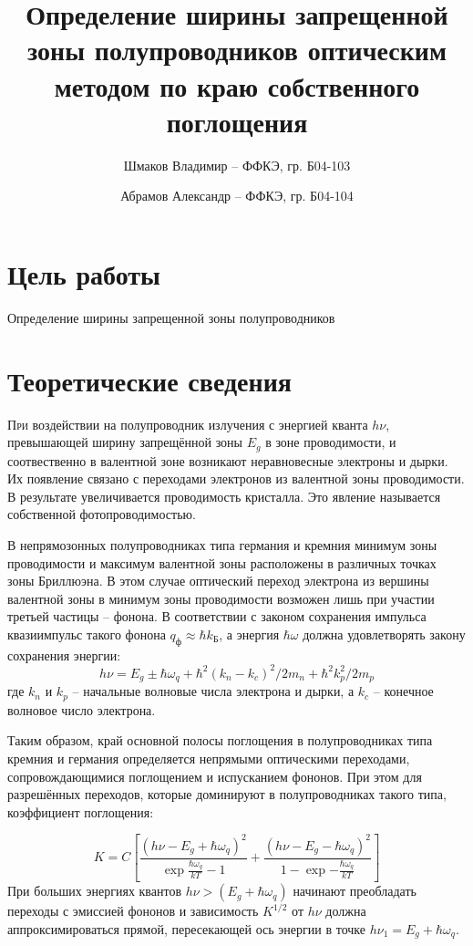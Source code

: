 \documentclass[a4paper, 12pt]{extarticle}
\title{\textcolor{main_title}{Определение ширины запрещенной зоны полупроводников оптическим методом по краю собственного поглощения}}
\author{
  Шмаков Владимир -- ФФКЭ, гр. Б04-103
  \and
  Абрамов Александр -- ФФКЭ, гр. Б04-104
}
\begin{document}
\maketitle



\section*{\textcolor{header}{Цель работы}}
    Определение ширины запрещенной зоны полупроводников
\section*{\textcolor{header}{Теоретические сведения}}

\lettrine{\textcolor{defenition}{П}}{\textcolor{defenition}{ри}} воздействии на полупроводник излучения с энергией кванта $h\nu$, превышающей ширину запрещённой зоны $E_g$ в зоне проводимости, и соотвественно в валентной зоне возникают неравновесные электроны и дырки. Их появление связано с переходами электронов из валентной зоны проводимости. В результате увеличивается проводимость кристалла. Это явление называется собственной фотопроводимостью.

В непрямозонных полупроводниках типа германия и кремния минимум зоны проводимости и максимум валентной зоны расположены в различных точках зоны Бриллюэна. В этом случае оптический переход электрона из вершины валентной зоны в минимум зоны проводимости возможен лишь при участии третьей частицы – фонона. В соответствии с законом сохранения импульса квазиимпульс такого фонона $q_{\text{ф}}\approx\hbar k_{\text{Б}}$, а энергия $\hbar\omega$ должна удовлетворять закону сохранения энергии:
\begin{equation}
    h\nu = E_g\pm \hbar\omega_q+\hbar^2(k_n-k_c)^2/2m_n+\hbar^2k_p^2/2m_p
\end{equation}
где $k_n$ и $k_p$ -- начальные волновые числа электрона и дырки, а $k_c$ -- конечное волновое число электрона.

Таким образом, край основной полосы поглощения в полупроводниках типа кремния и германия определяется непрямыми оптическими переходами, сопровождающимися поглощением и испусканием фононов. При этом для разрешённых переходов, которые доминируют в полупроводниках такого типа, коэффициент поглощения:

\begin{equation}
    K=C\left[\frac{(h\nu-E_g+\hbar\omega_q)^2}{\exp{\frac{\hbar\omega_q}{kT}}-1}+\frac{(h\nu-E_g-\hbar\omega_q)^2}{1-\exp{-\frac{\hbar\omega_q}{kT}}}\right]
\end{equation}
При больших энергиях квантов $h\nu>(E_g+\hbar\omega_q)$ начинают преобладать переходы с эмиссией фононов и зависимость $K^{1/2}$ от $h\nu$ должна аппроксимироваться прямой, пересекающей ось энергии в точке $h\nu_1=E_g+\hbar\omega_q$.
\end{document}
